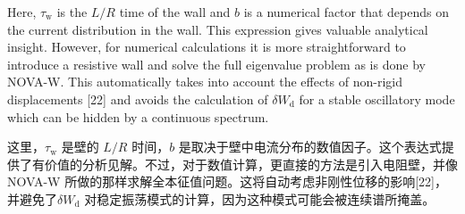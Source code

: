 \documentclass[utf8]{ctexart}
\newcommand\enzhbox[2]{
  	\quad\par \begin{paracol}{2} \colseprulecolor{black} 
  		\begin{spacing}{1.0}
  			\footnotesize  #1
  		\end{spacing}
  		\switchcolumn[1] 
  		#2
  	\end{paracol} \quad\par
  }
\begin{document}
\begin{sloppypar}
\enzhbox{  Here, $\tau_{\mathrm{w}}$ is the $L / R$ time of the wall and $b$ is a numerical factor that depends on the current distribution in the wall. This expression gives valuable analytical insight. However, for numerical calculations it is more straightforward to introduce a resistive wall and solve the full eigenvalue problem as is done by NOVA-W. This automatically takes into account the effects of non-rigid displacements \textcolor{green!50!black}{[22]} and avoids the calculation of $\delta W_{\mathrm{d}}$ for a stable oscillatory mode which can be hidden by a continuous spectrum.}{
这里，$\tau_{\mathrm{w}}$  是壁的 $L / R$  时间，$b$  是取决于壁中电流分布的数值因子。这个表达式提供了有价值的分析见解。不过，对于数值计算，更直接的方法是引入电阻壁，并像 NOVA-W 所做的那样求解全本征值问题。这将自动考虑非刚性位移的影响\textcolor{green!50!black}{[22]}，并避免了$\delta W_{\mathrm{d}}$ 对稳定振荡模式的计算，因为这种模式可能会被连续谱所掩盖。}
  

\end{sloppypar}
\end{document}
